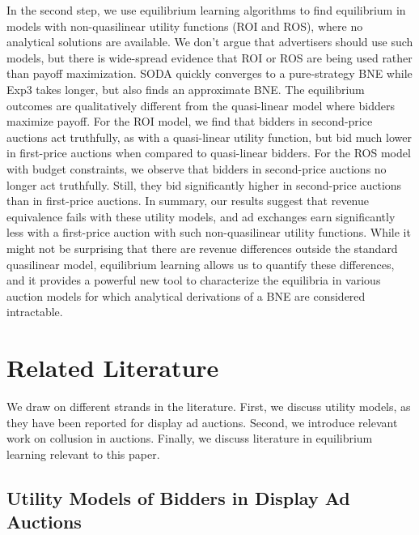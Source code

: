 \documentclass{article}
\begin{document}
In the second step, we use equilibrium learning algorithms to find equilibrium in models with non-quasilinear utility functions (ROI and ROS), where no analytical solutions are available. We don't argue that advertisers should use such models, but there is wide-spread evidence that ROI or ROS are being used rather than payoff maximization. 
SODA quickly converges to a pure-strategy BNE {while} Exp3 takes longer, but also finds an approximate BNE.   
The equilibrium outcomes are qualitatively different from the quasi-linear model where bidders maximize payoff. 
For the ROI model, we find that bidders in second-price auctions act truthfully, as with a quasi-linear utility function, but bid much lower in first-price auctions when compared to quasi-linear bidders. 
For the ROS model with budget constraints, we observe that bidders in second-price auctions no longer act truthfully. Still, they bid significantly higher in second-price auctions than in first-price auctions. 
In summary, our results suggest that revenue equivalence fails with these utility models, and ad exchanges earn significantly less with a first-price auction with such non-quasilinear utility functions. While it might not be surprising that there are revenue differences outside the standard quasilinear model, equilibrium learning allows us to quantify these differences, and it provides a powerful new tool to characterize the equilibria in various auction models for which analytical derivations of a BNE are considered intractable. 

\section{Related Literature}
\label{sec:lit}
We draw on different strands in the literature. First, we discuss utility models, as they have been reported for display ad auctions. Second, we introduce relevant work on collusion in auctions. Finally, we discuss literature in equilibrium learning relevant to this paper.




\subsection{Utility Models of Bidders in Display Ad Auctions} \label{sec:util_models}
\end{document}
